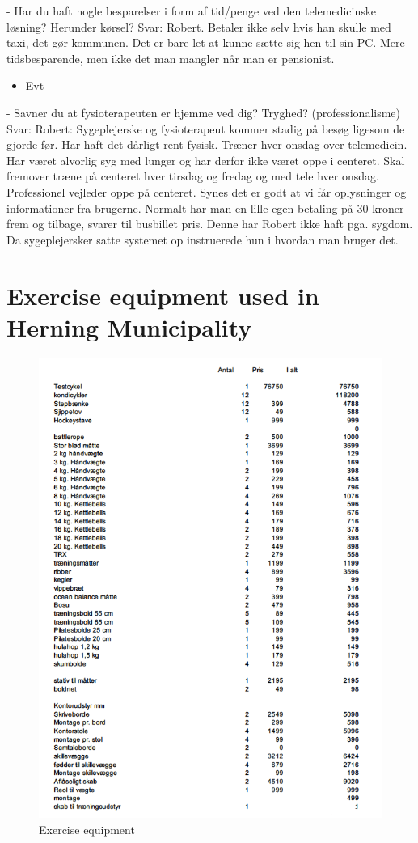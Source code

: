 -	Har du haft nogle besparelser i form af tid/penge ved den telemedicinske løsning?
Herunder kørsel?
Svar:
Robert. Betaler ikke selv hvis han skulle med taxi, det gør kommunen. Det er bare let at kunne sætte sig hen til sin PC. Mere tidsbesparende, men ikke det man mangler når man er pensionist.

\begin{itemize}
	\item Evt
\end{itemize}
-	Savner du at fysioterapeuten er hjemme ved dig? Tryghed? (professionalisme)
Svar:
Robert: Sygeplejerske og fysioterapeut kommer stadig på besøg ligesom de gjorde
før. Har haft det dårligt rent fysisk. Træner hver onsdag over telemedicin. Har været alvorlig syg med lunger og har derfor ikke været oppe i centeret. Skal fremover træne på centeret hver tirsdag og fredag og med tele hver onsdag. Professionel vejleder oppe på centeret. Synes det er godt at vi får oplysninger og informationer fra brugerne. Normalt har man en lille egen betaling på 30 kroner frem og tilbage, svarer til busbillet pris. Denne har Robert ikke haft pga. sygdom. Da sygeplejersker satte systemet op instruerede hun i hvordan man bruger det.


\chapter{Exercise equipment used in Herning Municipality}
\begin{figure}[H]
\centering
\includegraphics[width=1.0\textwidth]{Figure/8}
\caption{Exercise equipment}

\end{figure} 

 
